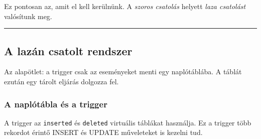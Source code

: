 \documentclass[
  magyar,
]{article}
\begin{document}
Ez pontosan az, amit el kell kerülnünk. A \emph{szoros csatolás} helyett
\emph{laza csatolást} valósítunk meg.

\begin{center}\rule{0.5\linewidth}{0.5pt}\end{center}

\subsection{A lazán csatolt rendszer}\label{a-lazuxe1n-csatolt-rendszer}

Az alapötlet: a trigger csak az eseményeket menti egy naplótáblába. A
táblát ezután egy tárolt eljárás dolgozza fel.

\subsubsection{A naplótábla és a
trigger}\label{a-napluxf3tuxe1bla-uxe9s-a-trigger}

A trigger az \texttt{inserted} és \texttt{deleted} virtuális táblákat
használja. Ez a trigger több rekordot érintő INSERT és UPDATE
műveleteket is kezelni tud.
\end{document}
